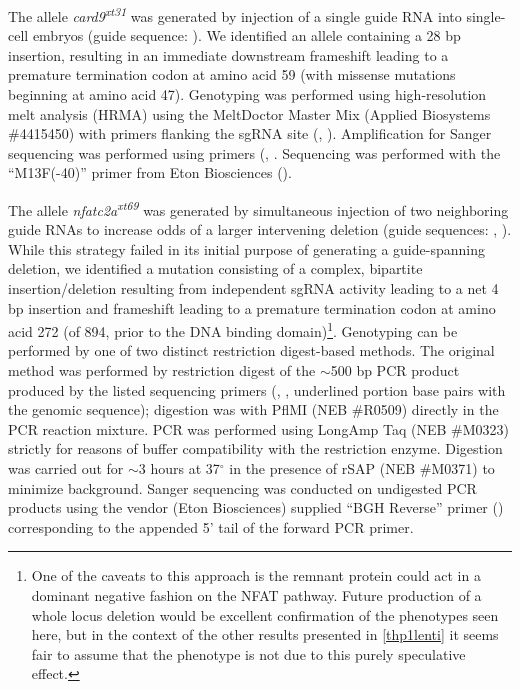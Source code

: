 The allele \textit{card9\textsuperscript{xt31}} was generated by injection of a single guide RNA into single\hyp{}cell embryos (guide sequence: ). We identified an allele containing a 28 bp insertion, resulting in an immediate downstream frameshift leading to a premature termination codon at amino acid 59 (with missense mutations beginning at amino acid 47). Genotyping was performed using high\hyp{}resolution melt analysis (HRMA) using the MeltDoctor Master Mix (Applied Biosystems \#4415450) with primers flanking the sgRNA site (, ). Amplification for Sanger sequencing was performed using primers (, . Sequencing was performed with the ``M13F(\hyp{}40)'' primer from Eton Biosciences ().

The allele \textit{nfatc2a\textsuperscript{xt69}} was generated by simultaneous injection of two neighboring guide RNAs to increase odds of a larger intervening deletion (guide sequences: , ). While this strategy failed in its initial purpose of generating a guide\hyp{}spanning deletion, we identified a mutation consisting of a complex, bipartite insertion/deletion resulting from independent sgRNA activity leading to a net 4 bp insertion and frameshift leading to a premature termination codon at amino acid 272 (of 894, prior to the DNA binding domain)\footnote{One of the caveats to this approach is the remnant protein could act in a dominant negative fashion on the NFAT pathway. Future production of a whole locus deletion would be excellent confirmation of the phenotypes seen here, but in the context of the other results presented in \autoref{thp1lenti} it seems fair to assume that the phenotype is not due to this purely speculative effect.}. Genotyping can be performed by one of two distinct restriction digest\hyp{}based methods. The original method was performed by restriction digest of the $\sim$500 bp PCR product produced by the listed sequencing primers (, , underlined portion base pairs with the genomic sequence); digestion was with PflMI (NEB \#R0509) directly in the PCR reaction mixture. PCR was performed using LongAmp Taq (NEB \#M0323) strictly for reasons of buffer compatibility with the restriction enzyme. Digestion was carried out for $\sim$3 hours at 37$^{\circ}$ in the presence of rSAP (NEB \#M0371) to minimize background. Sanger sequencing was conducted on undigested PCR products using the vendor (Eton Biosciences) supplied ``BGH Reverse'' primer () corresponding to the appended 5' tail of the forward PCR primer. 

